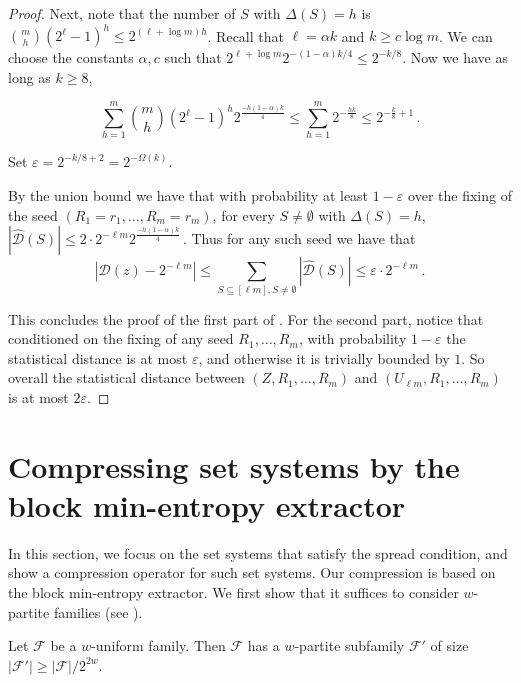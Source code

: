 \documentclass{toc}
\newcommand{\eps}{\varepsilon}
\newcommand{\calF}{\mathcal{F}} %
\newcommand{\calD}{\mathcal{D}} %
\begin{document}
\begin{proof}
Next, note that the number of $S$ with $\Delta(S)=h$ is 
$\binom{m}{h}(2^{\ell}-1)^h \leq  2^{(\ell+\log m)h}$. 
Recall that $\ell =\alpha k$ and $k\geq c \log m$. 
We can choose the constants $\alpha, c$ such that 
%
%
$2^{\ell+\log m} 2^{-(1-\alpha)k/4} \leq 2^{-k/8}$. 
Now we have as long as $k \geq 8$,

\begin{equation}
\sum_{h=1}^{m} \binom{m}{h}(2^{\ell}-1)^h 2^{\frac{-h(1-\alpha)k}{4}} \leq \sum_{h=1}^{m}2^{-\frac{hk}{8}} \leq 2^{-\frac{k}{8}+1}\,.
\end{equation}

Set
%
$\eps =2^{-k/8+2}=2^{-\Omega(k)}$. %

By the union bound we have that with probability at least $1-\eps$ over
the fixing of the seed
$(R_1=r_1, \ldots, R_m=r_m)$, for every $S \neq \emptyset$ with $\Delta(S)=h$,
$|\hat{\calD}(S) | \leq 2 \cdot 2^{-\ell m}2^{\frac{-h(1-\alpha)k}{4}}$\,. 
Thus for any such seed we have that
\begin{equation}
\left |{\calD}(z)-2^{-\ell m} \right |  \leq \sum_{S \subseteq [\ell m], S \neq \emptyset} \left |\hat{\calD}(S) \right | \leq \eps \cdot
2^{-\ell m}\,.
\end{equation}
  
This concludes the proof of the first part of . For the second part, notice that conditioned on the fixing of any
seed $R_1,\ldots,R_m$, with probability $1-\eps$ the statistical distance is at most $\eps$, and otherwise it is trivially bounded by $1$.
So overall the statistical distance between
$(Z, R_1, \ldots, R_m)$ and $(U_{\ell m}, R_1, \ldots, R_m)$ is at most 
$2\eps$.
\end{proof}


%
%
%
%


\section{Compressing set systems by the block min-entropy extractor}
\label{sec:sunflower}

In this section, we focus on the set systems that satisfy the spread condition, and show a compression operator for such set systems.
Our compression is based on the block min-entropy extractor. We first show that it suffices to consider
%
$w$-partite families  %
(see ).

\begin{lemma}
\label{lemma:normal}
Let $\calF$ be a
%
$w$-uniform family.  %
Then %
%
$\calF$ has a $w$-partite subfamily $\calF'$
of size $|\calF'|\geq|\calF|/2^{2w}$.   %
\end{lemma}
\end{document}

